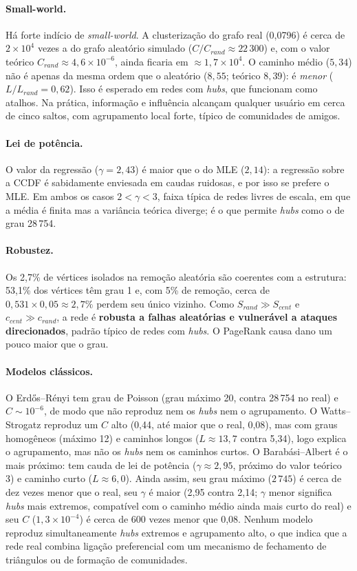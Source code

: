 \documentclass[sigconf]{webmedia}
\begin{document}
\paragraph{Small-world.} Há forte indício de \emph{small-world}. A clusterização do grafo real (0,0796) é cerca de $2\times10^{4}$ vezes a do grafo aleatório simulado ($C/C_{rand}\approx 22\,300$) e, com o valor teórico $C_{rand}\approx 4{,}6\times10^{-6}$, ainda ficaria em $\approx1{,}7\times10^{4}$. O caminho médio ($5{,}34$) não é apenas da mesma ordem que o aleatório ($8{,}55$; teórico $8{,}39$): é \emph{menor} ($L/L_{rand}=0{,}62$). Isso é esperado em redes com \emph{hubs}, que funcionam como atalhos. Na prática, informação e influência alcançam qualquer usuário em cerca de cinco saltos, com agrupamento local forte, típico de comunidades de amigos.

\paragraph{Lei de potência.} O valor da regressão ($\gamma=2{,}43$) é maior que o do MLE ($2{,}14$): a regressão sobre a CCDF é sabidamente enviesada em caudas ruidosas, e por isso se prefere o MLE. Em ambos os casos $2<\gamma<3$, faixa típica de redes livres de escala, em que a média é finita mas a variância teórica diverge; é o que permite \emph{hubs} como o de grau 28\,754.

\paragraph{Robustez.} Os 2,7\% de vértices isolados na remoção aleatória são coerentes com a estrutura: 53,1\% dos vértices têm grau 1 e, com 5\% de remoção, cerca de $0{,}531\times0{,}05\approx2{,}7\%$ perdem seu único vizinho. Como $S_{rand}\gg S_{cent}$ e $c_{cent}\gg c_{rand}$, a rede é \textbf{robusta a falhas aleatórias e vulnerável a ataques direcionados}, padrão típico de redes com \emph{hubs}. O PageRank causa dano um pouco maior que o grau.

\paragraph{Modelos clássicos.} O Erdős--Rényi tem grau de Poisson (grau máximo 20, contra 28\,754 no real) e $C\sim10^{-6}$, de modo que não reproduz nem os \emph{hubs} nem o agrupamento. O Watts--Strogatz reproduz um $C$ alto (0,44, até maior que o real, 0,08), mas com graus homogêneos (máximo 12) e caminhos longos ($L\approx13{,}7$ contra 5,34), logo explica o agrupamento, mas não os \emph{hubs} nem os caminhos curtos. O Barabási--Albert é o mais próximo: tem cauda de lei de potência ($\gamma\approx2{,}95$, próximo do valor teórico 3) e caminho curto ($L\approx6{,}0$). Ainda assim, seu grau máximo ($2\,745$) é cerca de dez vezes menor que o real, seu $\gamma$ é maior (2,95 contra 2,14; $\gamma$ menor significa \emph{hubs} mais extremos, compatível com o caminho médio ainda mais curto do real) e seu $C$ ($1{,}3\times10^{-4}$) é cerca de 600 vezes menor que 0,08. Nenhum modelo reproduz simultaneamente \emph{hubs} extremos e agrupamento alto, o que indica que a rede real combina ligação preferencial com um mecanismo de fechamento de triângulos ou de formação de comunidades.
\end{document}
